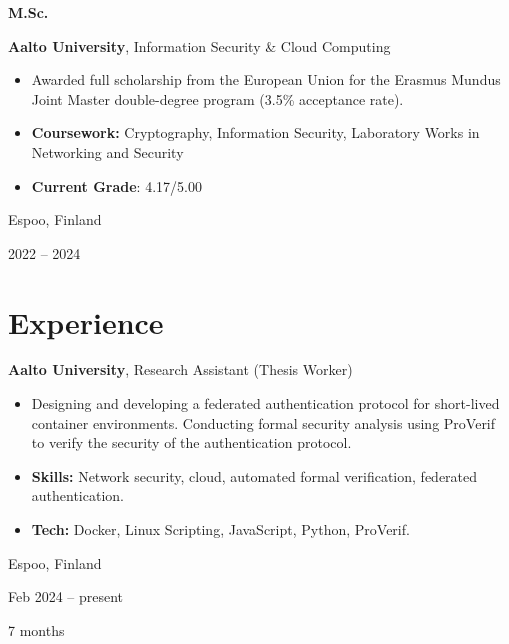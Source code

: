 \documentclass[10pt, a4paper]{article}
\newenvironment{highlights}{
    \begin{itemize}[
        topsep=0.10 cm,
        parsep=0.10 cm,
        partopsep=0pt,
        itemsep=0pt,
        leftmargin=0 cm + 10pt
    ]
}{
    \end{itemize}
} %
\newenvironment{twocolentry}[2][]{
    \onecolentry
    \def\secondColumn{#2}
    \setcolumnwidth{\fill, 3 cm}
    \begin{paracol}{2}
}{
    \switchcolumn \raggedleft \secondColumn
    \end{paracol}
    \endonecolentry
} %
\newenvironment{threecolentry}[3][]{
    \onecolentry
    \def\thirdColumn{#3}
    \setcolumnwidth{1 cm, \fill, 3 cm}
    \begin{paracol}{3}
    {\raggedright #2} \switchcolumn
}{
    \switchcolumn \raggedleft \thirdColumn
    \end{paracol}
    \endonecolentry
} %
\begin{document}
        \vspace{0.2 cm}

        \begin{threecolentry}{\textbf{M.Sc.}}{
            Espoo, Finland

        2022 – 2024
        }
            \textbf{Aalto University}, Information Security \& Cloud Computing
            \begin{highlights}
                \item Awarded full scholarship from the European Union for the Erasmus Mundus Joint Master double-degree program (3.5\% acceptance rate).
                \item \textbf{Coursework:} Cryptography, Information Security, Laboratory Works in Networking and Security
                \item \textbf{Current Grade}: 4.17/5.00
            \end{highlights}
        \end{threecolentry}


    
    \section{Experience}



        
        \begin{twocolentry}{
            Espoo, Finland

        Feb 2024 – present

        7 months
        }
            \textbf{Aalto University}, Research Assistant (Thesis Worker)
            \begin{highlights}
                \item Designing and developing a federated authentication protocol for short-lived container environments. Conducting formal security analysis using ProVerif to verify the security of the authentication protocol.
                \item \textbf{Skills:} Network security, cloud, automated formal verification, federated authentication.
                \item \textbf{Tech:} Docker, Linux Scripting, JavaScript, Python, ProVerif.
            \end{highlights}
        \end{twocolentry}


        \vspace{0.2 cm}
\end{document}
